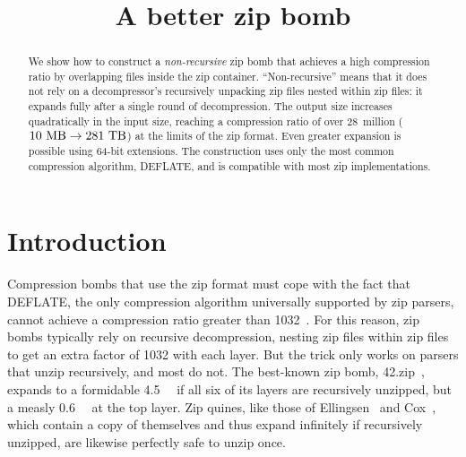 \documentclass[letterpaper,twocolumn,10pt]{article}
\newcommand{\MB}{\mega\byte}
\newcommand{\TB}{\tera\byte}
\newcommand{\PB}{\peta\byte}
\begin{document}
\date{}

\title{\Large \bf A better zip bomb}

\author{
}

\maketitle

\begin{abstract}
We show how to construct a
\emph{non-recursive} zip bomb
that achieves a high compression ratio by
overlapping files inside the zip container.
``Non-recursive'' means that it does not rely on
a decompressor's recursively unpacking zip files nested within zip files:
it expands fully after a single round of decompression.
The output size increases quadratically in the input size,
reaching a compression ratio of over 28~million
($\SI{10}{\MB} \rightarrow \SI{281}{\TB}$)
at the limits of the zip format.
Even greater expansion is possible using
64-bit extensions.
The construction uses only the most common compression algorithm, DEFLATE,
and is compatible with most zip implementations.
\end{abstract}


\section{Introduction}
\label{sec:intro}

Compression bombs that use the zip format
must cope with the fact that DEFLATE,
the only compression algorithm universally supported by zip parsers,
cannot achieve a compression ratio greater than
\num{1032}~\cite{zlib_tech}.
For this reason, zip bombs typically rely on recursive decompression,
nesting zip files within zip files to get an extra factor of 1032 with each layer.
But the trick only works on parsers that
unzip recursively, and most do not.
The best-known zip bomb, 42.zip~\cite{42.zip},
expands to a formidable \SI{4.5}{\PB}
if all six of its layers are recursively unzipped,
but a measly \SI{0.6}{\MB} at the top layer.
Zip quines, like those of
Ellingsen~\cite{ellingsen}
and Cox~\cite{cox},
which contain a copy of themselves
and thus expand infinitely if recursively unzipped,
are likewise perfectly safe to unzip once.
\end{document}
